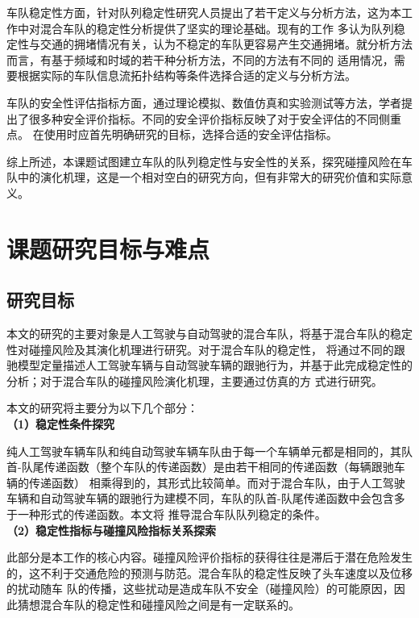 车队稳定性方面，针对队列稳定性研究人员提出了若干定义与分析方法，这为本工作中对混合车队的稳定性分析提供了坚实的理论基础。现有的工作
多认为队列稳定性与交通的拥堵情况有关，认为不稳定的车队更容易产生交通拥堵。就分析方法而言，有基于频域和时域的若干种分析方法，不同的方法有不同的
适用情况，需要根据实际的车队信息流拓扑结构等条件选择合适的定义与分析方法。

车队的安全性评估指标方面，通过理论模拟、数值仿真和实验测试等方法，学者提出了很多种安全评价指标。不同的安全评价指标反映了对于安全评估的不同侧重点。
在使用时应首先明确研究的目标，选择合适的安全评估指标。

综上所述，本课题试图建立车队的队列稳定性与安全性的关系，探究碰撞风险在车队中的演化机理，这是一个相对空白的研究方向，但有非常大的研究价值和实际意义。

\section{课题研究目标与难点}

\subsection{研究目标}

本文的研究的主要对象是人工驾驶与自动驾驶的混合车队，将基于混合车队的稳定性对碰撞风险及其演化机理进行研究。对于混合车队的稳定性，
将通过不同的跟驰模型定量描述人工驾驶车辆与自动驾驶车辆的跟驰行为，并基于此完成稳定性的分析；对于混合车队的碰撞风险演化机理，主要通过仿真的方
式进行研究。

本文的研究将主要分为以下几个部分：\\ 

\noindent \textbf{（1）稳定性条件探究}

纯人工驾驶车辆车队和纯自动驾驶车辆车队由于每一个车辆单元都是相同的，其队首-队尾传递函数（整个车队的传递函数）是由若干相同的传递函数（每辆跟驰车辆的传递函数）
相乘得到的，其形式比较简单。而对于混合车队，由于人工驾驶车辆和自动驾驶车辆的跟驰行为建模不同，车队的队首-队尾传递函数中会包含多于一种形式的传递函数。本文将
推导混合车队队列稳定的条件。 \\

\noindent \textbf{（2）稳定性指标与碰撞风险指标关系探索}

此部分是本工作的核心内容。碰撞风险评价指标的获得往往是滞后于潜在危险发生的，这不利于交通危险的预测与防范。混合车队的稳定性反映了头车速度以及位移的扰动随车
队的传播，这些扰动是造成车队不安全（碰撞风险）的可能原因，因此猜想混合车队的稳定性和碰撞风险之间是有一定联系的。

